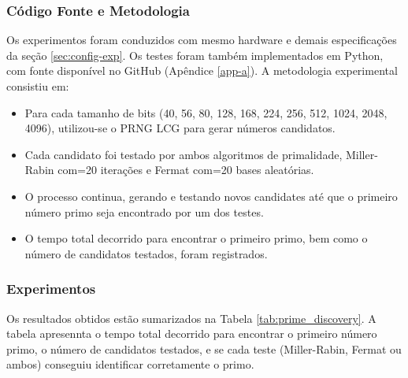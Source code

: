 \documentclass[a4paper, 11pt]{article}
\begin{document}
\subsubsection{Código Fonte e Metodologia}

Os experimentos foram conduzidos com mesmo hardware e demais especificações da seção \ref{sec:config-exp}. Os testes foram também implementados em Python, com fonte disponível no GitHub (Apêndice \ref{app-a}). A metodologia experimental consistiu em:
\begin{itemize}
    \item Para cada tamanho de bits (40, 56, 80, 128, 168, 224, 256, 512, 1024, 2048, 4096), utilizou-se o PRNG LCG para gerar números candidatos.
    \item Cada candidato foi testado por ambos algoritmos de primalidade, Miller-Rabin com=20 iterações e Fermat com=20 bases aleatórias.
    \item O processo continua, gerando e testando novos candidates até que o primeiro número primo seja encontrado por um dos testes.
    \item O tempo total decorrido para encontrar o primeiro primo, bem como o número de candidatos testados, foram registrados.
\end{itemize}

\subsubsection{Experimentos}

Os resultados obtidos estão sumarizados na Tabela \ref{tab:prime_discovery}. A tabela apresennta o tempo total decorrido para encontrar o primeiro número primo, o número de candidatos testados, e se cada teste (Miller-Rabin, Fermat ou ambos) conseguiu identificar corretamente o primo.
\end{document}
